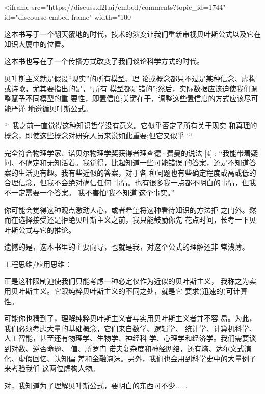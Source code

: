 <iframe src="https://discuss.d2l.ai/embed/comments?topic\_id=1744" id="discourse-embed-frame" width="100%



这本书写于一个翻天覆地的时代，技术的演变让我们重新审视贝叶斯公式以及它在知识大厦中的位置。 

这本书也写在了一个传播方式改变了我们谈论科学方式的时代。



贝叶斯主义就是假设“现实”的所有模型、理 论或概念都只不过是某种信念、虚构或诗歌，尤其要指出的是，“所有 模型都是错的”;然后，实际数据应该迫使我们调整赋予不同模型的重 要性，即置信度;关键在于，调整这些置信度的方式应该尽可能严谨 地遵循贝叶斯公式。

```
我之前一直觉得这种知识哲学没有意义。它似乎否定了所有关于现实
和真理的概念，即使这些概念对研究人员来说如此重要;但它又似乎
```

完全符合物理学家、诺贝尔物理学奖获得者理查德·费曼的说法 [4] : “我能带着疑问、不确定和无知活着。我觉得，比起知道一些可能错误 的答案，还是不知道答案的生活更有趣。我有些近似的答案，对于各 种问题也有些确定程度或高或低的合理信念，但我不会绝对确信任何 事情。也有很多我一点都不明白的事情，但我不一定需要一个答案。 我不害怕‘我不知道’这个事实。”

你可能会觉得这种观点激动人心，或者希望将这种看待知识的方法拒
之门外。然而在选择接受还是拒绝贝叶斯主义之前，我只能鼓励你先
花点时间，长考一下贝叶斯公式与它的推论。

遗憾的是，这本书里的主要向导，也就是我，对这个公式的理解还非 常浅薄。



工程思维/应用思维：



正是这种限制迫使我们只能考虑一种必定仅作为近似的贝叶斯主义， 我称之为实用贝叶斯主义。它跟纯粹贝叶斯主义的不同之处，就是它 要求(迅速的)可计算性。

可能你也猜到了，理解纯粹贝叶斯主义者与实用贝叶斯主义者并不容 易。为此，我们必须考虑大量的基础概念，它们来自数学、逻辑学、 统计学、计算机科学、人工智能，甚至还有物理学、生物学、神经科 学、心理学和经济学。我们需要谈到对数、逆否命题、 值、所罗门 诺夫复杂度和神经网络，还有熵、达尔文式演化、虚假回忆、认知偏 差和金融泡沫。另外，我们也会用到科学史中的大量例子来考验我们 这两位虚构人物。

对，我知道为了理解贝叶斯公式，要明白的东西可不少......

